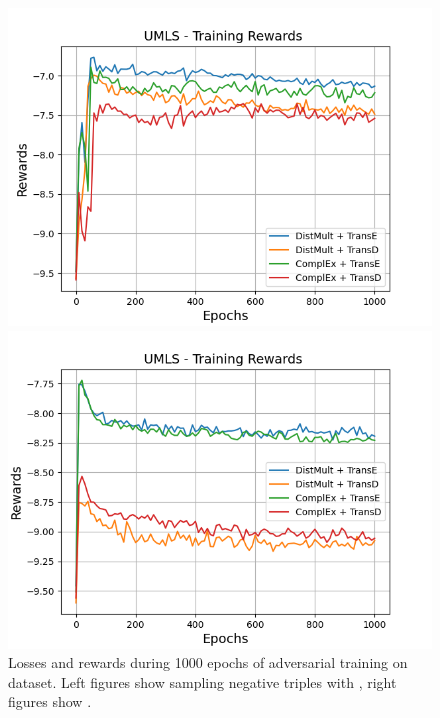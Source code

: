 \begin{figure}[H]
\begin{minipage}{.5\textwidth}
    \end{minipage}
    \begin{minipage}{.5\textwidth}
      \centering
      \includegraphics[width=0.9\linewidth]{figures/results/gan_train/not_pretrained/uncertainty/max/entropy/umls/1k_epochs/uncertainty_umls_rew.png}
    \end{minipage}%
    \begin{minipage}{.5\textwidth}
      \centering
      \includegraphics[width=0.9\linewidth]{figures/results/gan_train/not_pretrained/uncertainty/max_distribution/entropy/umls/1k_epochs/uncertainty_umls_rew.png}
    \end{minipage}%
    \caption{Losses and rewards during 1000 epochs of adversarial training on \umls dataset. 
    Left figures show sampling negative triples with \usmax, right figures show \ussoftmax.}
    \label{fig:advtrain_umls_usmax_ussoftmax_losses_rewards}
\end{figure}
